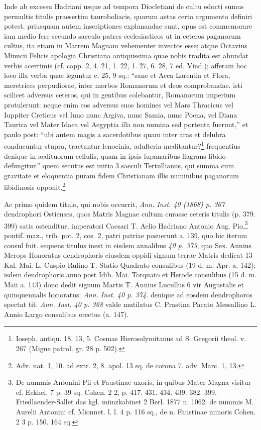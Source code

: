 \documentclass[a4paper, 11pt, oneside, polutonikogreek, german, twocolumn]{article}
\begin{document}
Inde ab excessu Hadriani usque ad tempora Diocletiani de cultu edocti sumus permultis titulis praesertim tauroboliacis, quorum aetas certo argumento definiri potest. priusquam autem inscriptiones explanandae sunt, opus est commemorare iam medio fere secundo saeculo patres ecclesiasticos ut in ceteros paganorum cultus, ita etiam in Matrem Magnam vehementer invectos esse; atque Octavius Minucii Felicis apologia Christiana antiquissima quae nobis tradita est abundat verbis acerrimis (cf. capp. 2, 4. 21, 1. 22, 1. 27, 6. 28, 7 ed. Vind.); afferam hoc loco illa verba quae leguntur c. 25, 9 sq.: "`sane et Acca Larentia et Flora, meretrices perpudiosae, inter morbos Romanorum et deos comprobandae. isti scilicet adversus ceteros, qui in gentibus colebantur, Romanorum imperium protulerunt: neque enim eos adversus suos homines vel Mars Thracicus vel Iuppiter Creticus vel Iuno nunc Argiva, nunc Samia, nunc Poena, vel Diana Taurica vel Mater Idaea vel Aegyptia illa non numina sed portenta fuerunt,"' et paulo post: "`ubi autem magis a sacerdotibus quam inter aras et delubra conducuntur stupra, tractantur lenocinia, adulteria meditantur?\footnote{Ioseph. antiqu. 18, 13, 5. Cosmas Hierosolymitanus ad S. Gregorii theol. v. 267 (Migne patrol. gr. 28 p. 502).} frequentius denique in aedituorum cellulis, quam in ipsis lupanaribus flagrans libido defungitur."' quem secutus est initio 3 saeculi Tertullianus, qui summa cum gravitate et eloquentia puram fidem Christianam illis numinibus paganorum libidinosis opponit.\footnote{Adv. nat. 1, 10. ad extr. 2, 8. apol. 13 sq. de corona 7. adv. Marc. 1, 13.}

Ac primo quidem titulo, qui nobis occurrit, \emph{Ann. Inst. 40 (1868) p. 367} dendrophori Ostienses, quos Matris Magnae cultum curasse ceteris titulis (p. 379. 399) satis ostenditur, imperatori Caesari T. Aelio Hadriano Antonio Aug. Pio,\footnote{De nummis Antonini Pii et Faustinae uxoris, in quibus Mater Magna visitur cf. Eckhel. 7 p. 39 sq. Cohen. 2 2, p. 417. 431. 434. 439. 382. 399. Friedlaender-Sallet das kgl. münzkabinet 2 Berl. 1877 n. 1062. de nummis M. Aurelii Antonini cf. Mionnet. l. l. 4 p. 116 sq., de n. Faustinae minoris Cohen. 2 3 p. 150. 164 sq.} pontif. max., trib. pot. 2, cos. 2, patri patriae posuerunt a. 139, quo hic iterum consul fuit. sequens titulus inest in eisdem annalibus \emph{40 p. 373}, quo Sex. Annius Merops Honoratus dendrophoris eiusdem oppidi signum terrae Matris dedicat 13 Kal. Mai. L. Cuspio Rufino T. Statio Quadrato consulibus (19 d. m. Apr. a. 142); isdem dendrophoris anno post Idib. Mai. Torquato et Herode consulibus (15 d. m. Maii a. 143) dono dedit signum Martis T. Annius Lucullus 6 vir Augustalis et quinquennalis honoratus: \emph{Ann. Inst. 40 p. 374.} denique ad eosdem dendrophoros spectat tit. \emph{Ann. Inst. 40 p. 368} valde mutilatus C. Prastina Pacato Messallino L. Annio Largo consulibus erectus (a. 147).
\end{document}
